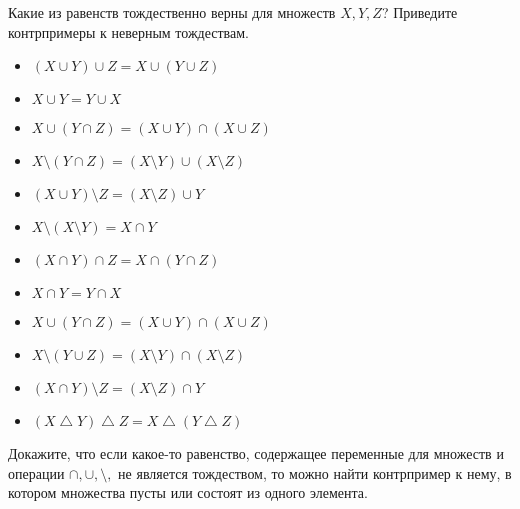 \documentclass{article}
\begin{document}
    \begin{task_boxed}
        Какие из равенств тождественно верны для множеств $X,Y,Z$? Приведите контрпримеры к неверным тождествам.
        \newline

        \begin{minipage}[c]{0.5\textwidth}
            \begin{itemize}
                \item $(X \cup Y) \cup Z = X \cup (Y \cup Z)$
                \item $X \cup Y = Y \cup X$
                \item $X \cup (Y \cap Z) = (X \cup Y) \cap (X \cup Z)$
                \item $X \setminus (Y \cap Z) = (X \setminus Y) \cup (X \setminus Z)$
                \item $(X \cup Y) \setminus Z = (X \setminus Z) \cup Y$
                \item $X \setminus (X \setminus Y) = X \cap Y$
            \end{itemize}
        \end{minipage}
        \begin{minipage}[c]{0.5\textwidth}
            \begin{itemize}
                \item $(X \cap Y) \cap Z = X \cap (Y \cap Z)$
                \item $X \cap Y = Y \cap X$
                \item $X \cup (Y \cap Z) = (X \cup Y) \cap (X \cup Z)$
                \item $X \setminus (Y \cup Z) = (X \setminus Y) \cap (X \setminus Z)$
                \item $(X \cap Y) \setminus Z = (X \setminus Z) \cap Y$
                \item $(X \bigtriangleup Y) \bigtriangleup Z = X \bigtriangleup (Y \bigtriangleup Z)$
            \end{itemize}
        \end{minipage}
    \end{task_boxed}

    \begin{task_boxed}
        Докажите, что если какое-то равенство, содержащее переменные для множеств и операции $\cap, \cup, \setminus,$ не является тождеством, то можно найти контрпример к нему, в котором множества пусты или состоят из одного элемента.
    \end{task_boxed}
\end{document}
